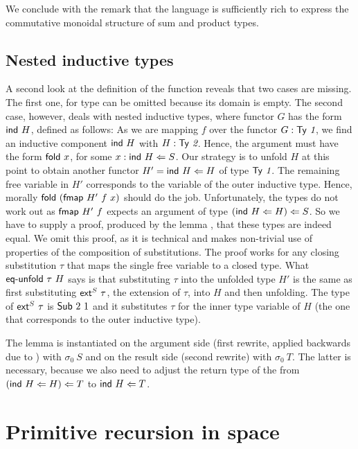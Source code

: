 \documentclass[a4paper,USenglish,cleveref, autoref, thm-restate]{lipics-v2021}
\begin{document}
We conclude with the remark that the language is sufficiently rich to
express the commutative monoidal structure of sum and product types.

\subsection{Nested inductive types}
\label{sec:closer-look-at}

A second look at the definition of the {\Afmap} function reveals that
two cases are missing. The first one, for type {\ATZ} can be omitted
because its domain is empty. The second case, however, deals with
nested inductive types, where functor $G$ has the form $\Aind~H$, defined as follows:
\ccFunFmapSignature
\vspace{-1.5\baselineskip}
\ccFunFmapInd
As we are mapping $f$ over the functor $G : \ATy{~1}$, we find an
inductive component $\Aind~H$ with $H : \ATy{~2}$. Hence, the argument
must have the form $\Afold\ x$, for some $x : \Aind~H \Leftarrow S$.
Our strategy is to unfold $H$ at this point to obtain another functor
$H' = \Aind~H \Leftarrow H$ of type $\ATy{~1}$. The remaining free variable in $H'$
corresponds to the variable of the outer inductive type. Hence,
morally $\Afold~ (\Afmap~H'~f~x)$ should do the job. Unfortunately,
the types do not work out as $\Afmap~H'~f$ expects an argument of type
$(\Aind~H \Leftarrow H) \Leftarrow S$. So we have to supply a proof,
produced by the lemma \Aeq, that these types are indeed equal.
\ccEqUnfold
We omit this proof, as it is technical and makes non-trivial
use of properties of the composition of substitutions.
The proof works for any closing substitution $\tau$ that maps the
single free variable to a closed type. What {$\Aeq~\tau~H$} says is 
that substituting $\tau$ into the unfolded type $H'$ is the same as
first substituting $\Aext^S\ \tau$, the extension of $\tau$, into
$H$ and then unfolding. The type of $\Aext^S\ \tau$ is $\ASub~2~1$ and
it substitutes $\tau$ for the inner type variable of $H$ (the one that
corresponds to the outer inductive type). 

The {\Aeq} lemma is instantiated on the argument side (first rewrite,
applied backwards due to \Asym) with $\sigma_0~S$ and on the result
side (second rewrite) with $\sigma_0~T$. The latter is necessary, because we also need
to adjust the return type of the {\Afmap} from $(\Aind~H \Leftarrow H)
\Leftarrow T$ to $\Aind~H \Leftarrow T$. 


\section{Primitive recursion in space}
\label{sec:prim-recurs-space}

\end{document}
